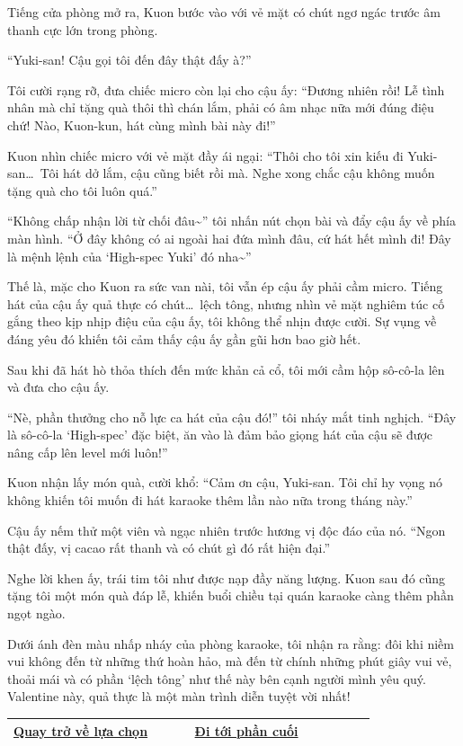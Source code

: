 \documentclass[../main.tex]{subfiles}
\begin{document}
Tiếng cửa phòng mở ra, Kuon bước vào với vẻ mặt có chút ngơ ngác trước âm thanh cực lớn trong phòng.

``Yuki-san! Cậu gọi tôi đến đây thật đấy à?''

Tôi cười rạng rỡ, đưa chiếc micro còn lại cho cậu ấy: ``Đương nhiên rồi! Lễ tình nhân mà chỉ tặng quà thôi thì chán lắm, phải có âm nhạc nữa mới đúng điệu chứ! Nào, Kuon-kun, hát cùng mình bài này đi!''

Kuon nhìn chiếc micro với vẻ mặt đầy ái ngại: ``Thôi cho tôi xin kiếu đi Yuki-san\dots\ Tôi hát dở lắm, cậu cũng biết rồi mà. Nghe xong chắc cậu không muốn tặng quà cho tôi luôn quá.''

``Không chấp nhận lời từ chối đâu\~{}'' tôi nhấn nút chọn bài và đẩy cậu ấy về phía màn hình. ``Ở đây không có ai ngoài hai đứa mình đâu, cứ hát hết mình đi! Đây là mệnh lệnh của `High-spec Yuki' đó nha\~{}''

Thế là, mặc cho Kuon ra sức van nài, tôi vẫn ép cậu ấy phải cầm micro. Tiếng hát của cậu ấy quả thực có chút\dots\ lệch tông, nhưng nhìn vẻ mặt nghiêm túc cố gắng theo kịp nhịp điệu của cậu ấy, tôi không thể nhịn được cười. Sự vụng về đáng yêu đó khiến tôi cảm thấy cậu ấy gần gũi hơn bao giờ hết.

Sau khi đã hát hò thỏa thích đến mức khản cả cổ, tôi mới cầm hộp sô-cô-la lên và đưa cho cậu ấy.

``Nè, phần thưởng cho nỗ lực ca hát của cậu đó!'' tôi nháy mắt tinh nghịch. ``Đây là sô-cô-la `High-spec' đặc biệt, ăn vào là đảm bảo giọng hát của cậu sẽ được nâng cấp lên level mới luôn!''

Kuon nhận lấy món quà, cười khổ: ``Cảm ơn cậu, Yuki-san. Tôi chỉ hy vọng nó không khiến tôi muốn đi hát karaoke thêm lần nào nữa trong tháng này.''

Cậu ấy nếm thử một viên và ngạc nhiên trước hương vị độc đáo của nó. ``Ngon thật đấy, vị cacao rất thanh và có chút gì đó rất hiện đại.''

Nghe lời khen ấy, trái tim tôi như được nạp đầy năng lượng. Kuon sau đó cũng tặng tôi một món quà đáp lễ, khiến buổi chiều tại quán karaoke càng thêm phần ngọt ngào.

Dưới ánh đèn màu nhấp nháy của phòng karaoke, tôi nhận ra rằng: đôi khi niềm vui không đến từ những thứ hoàn hảo, mà đến từ chính những phút giây vui vẻ, thoải mái và có phần `lệch tông' như thế này bên cạnh người mình yêu quý. Valentine này, quả thực là một màn trình diễn tuyệt vời nhất!

\begin{table}[H]
  \centering
  \setlength{\arrayrulewidth}{1pt}
  \begin{tabular}{|>{\centering\arraybackslash}p{0.4\linewidth}|>{\centering\arraybackslash}p{0.4\linewidth}|}
    \hline
    \hyperref[choice]{Quay trở về lựa chọn} & \hyperref[ending]{Đi tới phần cuối} \\ \hline
  \end{tabular}
\end{table}
\end{document}
